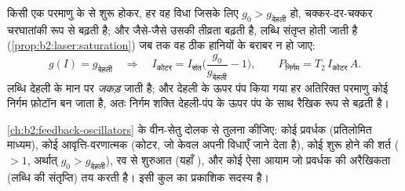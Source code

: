 \begin{proposition}\label{prop:b2:laser:steady}
किसी एक परमाणु के  से शुरू होकर, हर वह विधा जिसके लिए
$g_0 > g_{\text{देहली}}$ हो, चक्कर-दर-चक्कर चरघातांकी रूप से बढ़ती है;
और जैसे-जैसे उसकी तीव्रता बढ़ती है, लब्धि संतृप्त होती जाती है
(\cref{prop:b2:laser:saturation}) जब तक वह ठीक हानियों के बराबर न हो जाए:
\[
g(I) = g_{\text{देहली}} \quad\Longrightarrow\quad
I_{\text{कोटर}} = I_{\text{संत}}\Big(\frac{g_0}{g_{\text{देहली}}} - 1\Big),
\qquad P_{\text{निर्गम}} = T_2\,I_{\text{कोटर}}\,A .
\]
लब्धि देहली के मान पर \emph{जकड़} जाती है; और देहली के ऊपर पंप किया गया हर
अतिरिक्त परमाणु कोई निर्गम फ़ोटॉन बन जाता है, अतः निर्गम शक्ति
देहली-पंप के ऊपर पंप के साथ रैखिक रूप से बढ़ती है।
\end{proposition}

\begin{remark}[लेज़र कोई पुनर्भरण दोलक है]\label{rem:b2:laser:feedback}
\cref{ch:b2:feedback-oscillators} के वीन-सेतु दोलक से
तुलना कीजिए: कोई प्रवर्धक (प्रतिलोमित माध्यम),
कोई आवृत्ति-वरणात्मक  (कोटर, जो केवल अपनी विधाएँ जाने देता है),
कोई शुरू होने की शर्त ( $> 1$, अर्थात् $g_0 > g_{\text{देहली}}$),
रव से शुरुआत (यहाँ ), और कोई ऐसा आयाम जो
प्रवर्धक की अरैखिकता (लब्धि की संतृप्ति) तय करती है।  इसी
कुल का प्रकाशिक सदस्य है।
\end{remark}


